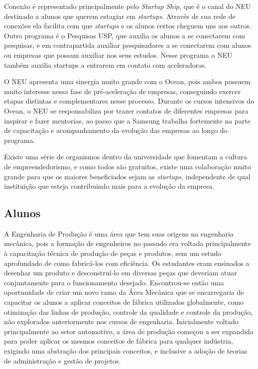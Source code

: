 Conexão é representado principalmente pelo \textit{Startup Ship}, que é o canal do NEU destinado a alunos que querem estagiar em \textit{startups}. Através de sua rede de conexões ela facilita com que \textit{startups} e os alunos certos cheguem uns aos outros. Outro programa é o Pesquisas USP, que auxilia os alunos a se conectarem com pesquisas, e em contrapartida auxiliar pesquisadores a se conectarem com alunos ou empresas que possam auxiliar nos seus estudos. Nesse programa o NEU também auxilia startups a entrarem em contato com aceleradoras.

O NEU apresenta uma sinergia muito grande com o Ocean, pois ambos possuem muito interesse nessa fase de pré-aceleração de empresas, conseguindo exercer etapas distintas e complementares nesse processo. Durante os cursos intensivos do Ocean, o NEU se responsabiliza por trazer contatos de diferentes empresas para inspirar e fazer mentorias, ao passo que a Samsung trabalha fortemente na parte de capacitação e acompanhamento da evolução das empresas ao longo do programa.

Existe uma série de organismos dentro da universidade que fomentam a cultura de empreendedorismo, e como todos são gratuitos, existe uma colaboração muito grande para que os maiores beneficiados sejam as \textit{startups}, independente de  qual instituição que esteja contribuindo mais para a evolução da empresa.

\subsection{Alunos}
\label{sec:con_alunos}

A Engenharia de Produção é uma área que tem suas origens na engenharia mecânica, pois a formação de engenheiros no passado era voltada principalmente à capacitação técnica de produção de peças e produtos, sem um estudo aprofundado de como fabricá-los com eficiência. Os estudantes eram ensinados a desenhar um produto e desconstruí-lo em diversas peças que deveriam atuar conjuntamente para o funcionamento desejado. Encontrou-se então uma oportunidade de criar um novo ramo da Área Mecânica que se encarregaria de capacitar os alunos a aplicar conceitos de fábrica utilizados globalmente, como otimização das linhas de produção, controle da qualidade e controle da produção, não explorados anteriormente nos cursos de engenharia. Inicialmente voltado principalmente ao setor automotivo, a área de produção começou a ser expandida para poder aplicar os mesmos conceitos de fábrica para qualquer indústria, exigindo uma abstração dos principais conceitos, e inclusive a adoção de teorias de administração e gestão de projetos.

